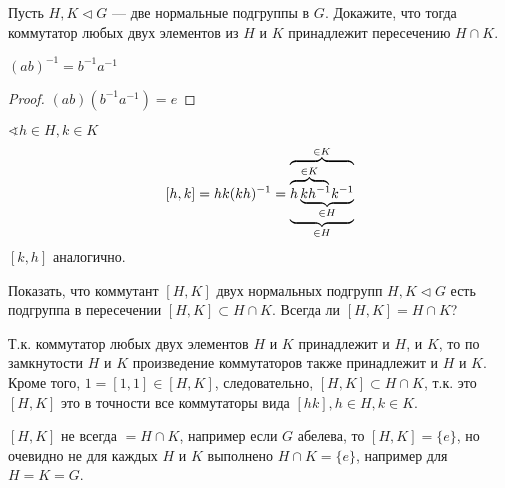 

\cfoot{}



\begin{exercise}
    Пусть \(H, K \vartriangleleft G\) --- две нормальные подгруппы в \(G\). Докажите, что тогда коммутатор любых двух элементов из \(H\) и \(K\) принадлежит пересечению \(H \cap K\).
\end{exercise}
\begin{solution}
    \begin{lemma}
        \((ab)^{-1} = b^{-1}a^{-1}\)
    \end{lemma}
    \begin{proof}
        \((ab)(b^{-1}a^{-1}) = e\)
    \end{proof}
    \(\sphericalangle h \in H, k \in K\)
    \[[h, k] = hk(kh)^{-1} = \overbrace{\underbrace{\lefteqn{\overbrace{\phantom{hkh^{-1}}}^{\in K}}h
        \underbrace{kh^{-1}k^{-1}}_{\in H}}_{\in H}}^{\in K}\]
    \([k, h]\) аналогично.
\end{solution}

\begin{exercise}
    Показать, что коммутант \([H, K]\) двух нормальных подгрупп \(H, K \vartriangleleft G\) есть подгруппа в пересечении \([H, K] \subset H \cap K\). Всегда ли \([H, K] = H \cap K\)?
\end{exercise}
\begin{solution}
    Т.к. коммутатор любых двух элементов \(H\) и \(K\) принадлежит и \(H\), и \(K\), то по замкнутости \(H\) и \(K\) произведение коммутаторов также принадлежит и \(H\) и \(K\). Кроме того, \(1 = [1, 1] \in [H, K]\), следовательно, \([H, K] \subset H \cap K\), т.к. это \([H, K]\) это в точности все коммутаторы вида \([hk], h \in H, k \in K\).

    \([H, K]\) не всегда \( = H \cap K\), например если \(G\) абелева, то \([H, K] = \{e\}\), но очевидно не для каждых \(H\) и \(K\) выполнено \(H \cap K = \{e\}\), например для \(H = K = G\).
\end{solution}

